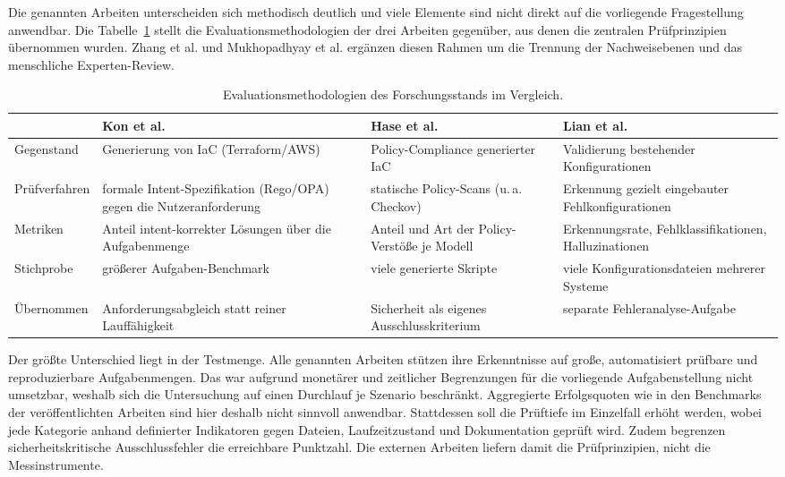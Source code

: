 Die genannten Arbeiten unterscheiden sich methodisch deutlich und viele Elemente sind nicht direkt auf die vorliegende Fragestellung anwendbar. Die Tabelle~\ref{tab:forschungsstand-methoden} stellt die Evaluationsmethodologien der drei Arbeiten gegenüber, aus denen die zentralen Prüfprinzipien übernommen wurden. Zhang et al. und Mukhopadhyay et al. ergänzen diesen Rahmen um die Trennung der Nachweisebenen und das menschliche Experten-Review.

\begin{table}[htbp]
\centering
\small
\begin{tabular}{p{} p{} p{} p{}}
\hline
 & \textbf{Kon et al.} & \textbf{Hase et al.} & \textbf{Lian et al.} \\
\hline
Gegenstand & Generierung von \ac{IaC} (Terraform/\ac{AWS}) & Policy-Compliance
generierter \ac{IaC} & Validierung bestehender Konfigurationen \\
\addlinespace
Prüfverfahren & formale Intent-Spezifikation (Rego/\acs{OPA}) gegen die
Nutzeranforderung & statische Policy-Scans (u.\,a. Checkov) & Erkennung
gezielt eingebauter Fehlkonfigurationen \\
\addlinespace
Metriken & Anteil intent-korrekter Lösungen über die Aufgabenmenge &
Anteil und Art der Policy-Verstöße je Modell & Erkennungsrate,
Fehlklassifikationen, Halluzinationen \\
\addlinespace
Stichprobe & größerer Aufgaben-Benchmark & viele generierte Skripte & viele
Konfigurationsdateien mehrerer Systeme \\
\addlinespace
Übernommen & Anforderungsabgleich statt reiner Lauffähigkeit & Sicherheit als
eigenes Ausschlusskriterium & separate Fehleranalyse-Aufgabe \\
\hline
\end{tabular}
\caption{Evaluationsmethodologien des Forschungsstands im Vergleich.}
\label{tab:forschungsstand-methoden}
\end{table}

Der größte Unterschied liegt in der Testmenge. Alle genannten Arbeiten stützen ihre Erkenntnisse auf große, automatisiert prüfbare und reproduzierbare Aufgabenmengen. 
Das war aufgrund monetärer und zeitlicher Begrenzungen für die vorliegende Aufgabenstellung nicht umsetzbar, weshalb sich die Untersuchung auf einen Durchlauf je Szenario beschränkt.
Aggregierte Erfolgsquoten wie in den Benchmarks der veröffentlichten Arbeiten sind hier deshalb nicht sinnvoll anwendbar. 
Stattdessen soll die Prüftiefe im Einzelfall erhöht werden, wobei jede Kategorie anhand definierter Indikatoren gegen Dateien, Laufzeitzustand und Dokumentation geprüft wird. Zudem begrenzen sicherheitskritische Ausschlussfehler die erreichbare Punktzahl.
Die externen Arbeiten liefern damit die Prüfprinzipien, nicht die Messinstrumente.


